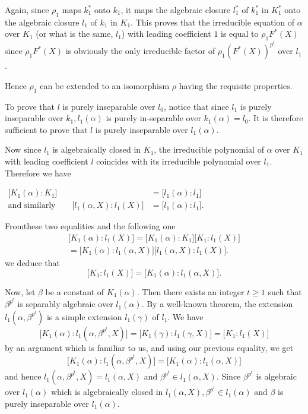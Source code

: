  Again, since $\rho_1$ maps $k^*_1$ onto $k_1$, it maps the algebraic
 closure $l^*_1$ of $k^*_1$ in $K^*_1$ onto the algebraic closure
 $l_1$ of $k_1$ in $K_1$. This proves that the irreducible equation of
 $\alpha$ over $K_1$ (or what is the same, $l_1$) with leading
 coefficient $1$ is equal to $\rho_1 F^* (X)$ since $\rho_1 F^{*} (X)$
 is obviously the only irreducible factor of $\rho_1 (F^*(X))^{p^t}$
 over $l_1$. 
 
 Hence $\rho_1$ can be extended to an isomorphism $\rho$ having the
 requisite properties. 
 
 To prove that $l$ is purely inseparable over $l_0$, notice that since
 $l_1$ is purely inseparable over $k_1, l_1 (\alpha)$ is purely
 in-separable over $k_1(\alpha) = l_0$. It is therefore sufficient to
 prove that $l$ is purely inseparable over $l_1 (\alpha)$. 
 
 Now since $l_1$ is algebraically closed in $K_1$, the irreducible
 polynomial of $\alpha$ over $K_1$ with leading coefficient $l$
 coincides with its irreducible polynomial over $l_1$. Therefore we
 have 
 
\medskip
\noindent 
$\begin{aligned}
   \big [K_1 (\alpha) : K_1 \big ] & = \big [ l_1 (\alpha) : l_1 \big]\\
   \text{and similarly} \qquad  
   \big [ l_1 (\alpha, X) : l_1 (X) \big ] & = \big [ l_1 (\alpha) : l_1
     \big ].
\end{aligned}
 $\medskip
 
 From\pageoriginale these two equalities and the following one
 \begin{multline*}
 \big [ K_1 (\alpha) : l_1 (X) \big] = \big [ K_1 (\alpha) : K_1 \big
 ] \big [ K_1 : l_1 (X) \big ]\\ 
 = \big [K_1 (\alpha) : l_1 (\alpha, X)
   \big ] \big [l_1 (\alpha, X) : l_1 (X) \big]. 
 \end{multline*}
we deduce that
$$
\big [K_1 : l_1 (X) \big ] = \big [K_1 (\alpha) : l_1 (\alpha, X) \big ].
$$

Now, let $\beta$ be a constant of $K_1 (\alpha)$. Then there exists an
integer $t \ge 1$ such that $\beta^{p^t}$ is separably algebraic over
$l_1 (\alpha)$. By a well-known theorem, the extension $l_1 (\alpha,
\beta^{p^t})$ is a simple extension $l_1 (\gamma)$ of $l_1$. We have 
$$
\big [K_1 (\alpha) : l_1 (\alpha, \beta^{p^t}, X) \big ] = \big [K_1
  (\gamma) : l_1 (\gamma, X) \big] = \big [ K_1 : l_1 (X) \big] 
$$
by an argument which is familiar to us, and using our previous 
equality, we get   
$$
\big [ K_1 (\alpha) : l_1 (\alpha, \beta^{p^t}, X) \big ] = \big [K_1
  (\alpha) : l_1 (\alpha, X) \big] 
$$
and hence $l_1 (\alpha, \beta^{p^t}, X) = l_1 (\alpha, X)$ and
$\beta^{p^t} \in l_1 (\alpha, X)$. Since $\beta^{p^t} $ is algebraic
over $l_1 (\alpha)$ which is algebraically closed in $l_1 (\alpha, X),
\beta^{p^t} \in l_1 (\alpha)$ and $\beta$ is purely inseparable over
$l_1 (\alpha)$. 

